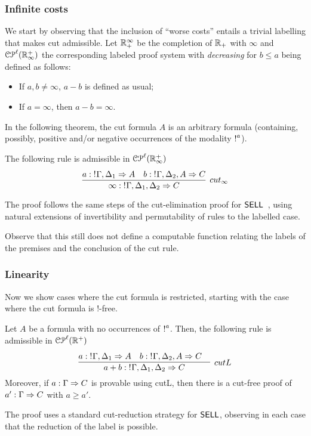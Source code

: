 \subsubsection{Infinite costs}
We start by observing that the inclusion of ``worse costs'' entails a trivial labelling 
that makes cut admissible. Let $\mathbb{R}_+^\infty$ be the completion of $\mathbb{R_+}$ with $\infty$ and $\mathcal{CP}^\ell(\mathbb{R}^{+}_\infty)$ the corresponding labeled proof system with {\em decreasing} for $b\leq a$ being defined as follows:
\begin{itemize}
\item If $a,b\not=\infty$, $a - b$ is defined as usual;
\item If $a=\infty$, then $a - b=\infty$.
 \end{itemize}
In the following theorem,  the cut formula $A$ is an arbitrary formula (containing, possibly, positive and/or negative occurrences of 
the modality $\hbox{$\mathop{!}^{a}$}$). 

\begin{theorem}
The following rule is admissible in $\mathcal{CP}^\ell(\mathbb{R}^{+}_\infty)$
$$
\infer[cut_\infty]{\infty: \nbang{}\Gamma,\Delta_1,\Delta_2 \seq C}{
 \deduce{a: \nbang{}\Gamma,\Delta_1 \seq A}{}&
  \deduce{b:\nbang{}\Gamma,\Delta_2, A \seq C}{}
 }
$$
\end{theorem}
The proof follows the same steps of the cut-elimination proof for $\textsf{SELL}$~\cite{DBLP:conf/kgc/DanosJS93,DBLP:journals/jar/NigamM10}, 
using natural extensions of invertibility and permutability of rules to the labelled case.

Observe that this still does not define a computable function relating the labels of the premises and the conclusion of the cut rule.
\subsubsection{Linearity}

Now we show cases where the cut formula is restricted, starting with the case where the cut formula is $!$-free. 
\begin{theorem}
Let $A$ be a formula with no occurrences of 
$\hbox{$\mathop{!}^{a}$}$. Then, the following rule is admissible in $\mathcal{CP}^\ell(\mathbb{R}^{+})$
$$
\infer[cutL]{a + b:\nbang{}\Gamma,\Delta_1,\Delta_2\seq  C}
{\deduce{a: \nbang{}\Gamma,\Delta_1 \seq A}{}&
 \deduce{b: \nbang{}\Gamma,\Delta_2, A \seq C}{}&
}
$$
Moreover, if $a: \Gamma \Rightarrow C$ is provable using cutL, then there is a cut-free proof of 
$a': \Gamma \Rightarrow C$ with $a \geq a'$.
\end{theorem}
The proof uses a standard cut-reduction strategy for $\textsf{SELL}$, observing in each case that the reduction of the label is possible. 

